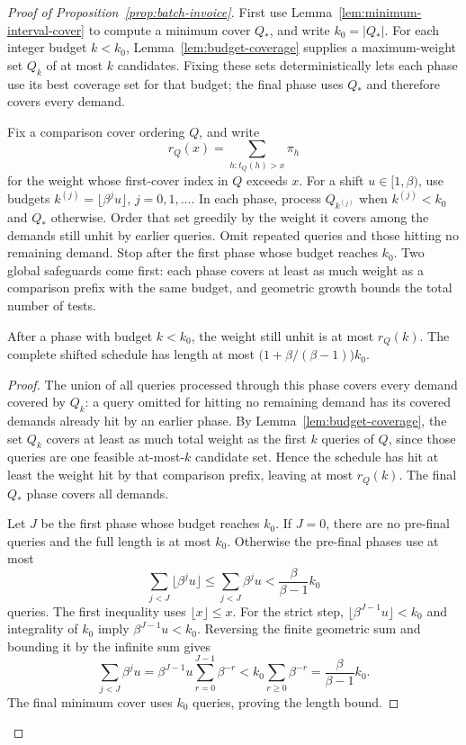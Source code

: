 \begin{proof}[Proof of Proposition~\ref{prop:batch-invoice}]

First use Lemma~\ref{lem:minimum-interval-cover} to compute a minimum
cover $Q_*$, and write $k_0=|Q_*|$. For each integer budget $k<k_0$,
Lemma~\ref{lem:budget-coverage} supplies a maximum-weight set
$Q_k$ of at most $k$ candidates. Fixing these sets deterministically
lets each phase use its best coverage set for that budget; the final
phase uses $Q_*$ and therefore covers every demand.

Fix a comparison cover ordering $Q$, and write
\[
 r_Q(x)=\sum_{h:t_Q(h)>x}\pi_h
\]
for the weight whose first-cover index in $Q$ exceeds $x$.
For a shift $u\in[1,\beta)$, use budgets
$k^{(j)}=\lfloor\beta^ju\rfloor$, $j=0,1,\ldots$.
In each phase, process $Q_{k^{(j)}}$ when $k^{(j)}<k_0$ and $Q_*$
otherwise. Order that set greedily by the weight it covers among
the demands still unhit by earlier queries. Omit repeated queries
and those hitting no remaining demand. Stop after the first phase
whose budget reaches $k_0$.
Two global safeguards come first: each phase covers at least as much
weight as a comparison prefix with the same budget, and geometric
growth bounds the total number of tests.

\begin{claim}
\label{clm:batch-phase-cover}
After a phase with budget $k<k_0$, the weight still unhit is at
most $r_Q(k)$. The complete shifted schedule has length at most
$\bigl(1+\beta/(\beta-1)\bigr)k_0$.
\end{claim}
\begin{proof}
The union of all queries processed through this phase covers every
demand covered by $Q_k$: a query omitted for hitting no remaining
demand has its covered demands already hit by an earlier phase.
By Lemma~\ref{lem:budget-coverage}, the set $Q_k$ covers at least
as much total weight as the first
$k$ queries of $Q$, since those queries are one feasible
at-most-$k$ candidate set. Hence the schedule has hit at least the
weight hit by that comparison prefix, leaving at most $r_Q(k)$.
The final $Q_*$ phase covers all demands.

Let $J$ be the first phase whose budget reaches $k_0$.
If $J=0$, there are no pre-final queries and the full length is at
most $k_0$. Otherwise the pre-final phases use at most
\[
 \sum_{j<J}\lfloor\beta^ju\rfloor
 \le\sum_{j<J}\beta^ju
 <\frac{\beta}{\beta-1}k_0
\]
queries. The first inequality uses $\lfloor x\rfloor\le x$.
For the strict step, $\lfloor\beta^{J-1}u\rfloor<k_0$ and
integrality of $k_0$ imply $\beta^{J-1}u<k_0$. Reversing the
finite geometric sum and bounding it by the infinite sum gives
\[
 \sum_{j<J}\beta^ju
 =\beta^{J-1}u\sum_{r=0}^{J-1}\beta^{-r}
 <k_0\sum_{r\ge0}\beta^{-r}
 =\frac{\beta}{\beta-1}k_0.
\]
The final minimum cover uses $k_0$ queries, proving the length
bound.
\end{proof}


\end{proof}
